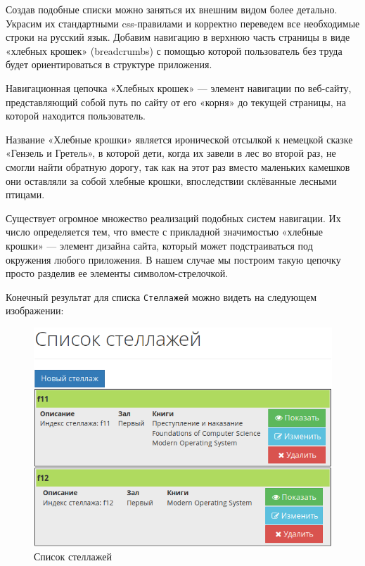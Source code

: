 Создав подобные списки можно заняться их внешним видом более детально.
Украсим их стандартными css-правилами и корректно переведем все
необходимые строки на русский язык. Добавим навигацию в верхнюю
часть страницы в виде «хлебных крошек» (breadcrumbs) с помощью
которой пользователь без труда будет ориентироваться
в структуре приложения.

Навигационная цепочка
«Хлебных крошек» --- элемент навигации
по веб-сайту, представляющий собой путь по сайту от
его «корня» до текущей страницы, на которой находится пользователь.

Название «Хлебные крошки» является иронической отсылкой к
немецкой сказке «Гензель и Гретель», в которой дети,
когда их завели в лес во второй раз, не смогли найти
обратную дорогу, так как на этот раз вместо маленьких камешков они
оставляли за собой хлебные крошки, впоследствии склёванные лесными птицами.

Существует огромное множество реализаций подобных систем навигации.
Их число определяется тем, что вместе с прикладной значимостью
«хлебные крошки» --- элемент дизайна сайта, который может подстраиваться
под окружения любого приложения. В нашем случае мы построим
такую цепочку просто разделив ее элементы символом-стрелочкой.

Конечный результат для списка \verb|Стеллажей| можно видеть на
следующем изображении:

\begin{figure}[ht!]
\begin{center}
\includegraphics[scale=0.75]{images/shelves-index.png}
\end{center}
\vspace*{-8mm}
\caption{Список стеллажей} \label{fig:shelves-index}
\end{figure}

